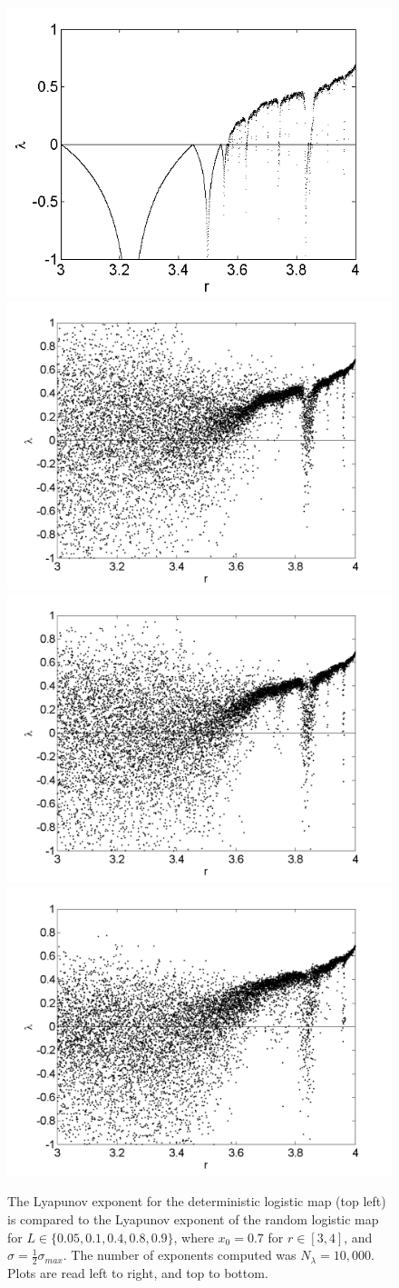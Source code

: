 \begin{figure}[!h]
\caption[Lyapunov exponent in the random logistic map compared to the
deterministic map, $\sigma=\frac{1}{2}\sigma_{max}$]{The Lyapunov exponent for the deterministic
  logistic map (top left) is compared
  to the Lyapunov exponent of the random logistic map for $L \in
  \{0.05,0.1,0.4,0.8,0.9\}$, where $x_0=0.7$ for $r \in [3,4]$, and $\sigma=\frac{1}{2}\sigma_{max}$. The number of exponents computed was $N_\lambda=10,000$. Plots are read left to right, and top to bottom. }\label{fig:rloglyap2_hs}
\centering
\includegraphics[width=.5\textwidth]{figs/det_log_lyap.png}\hfill
\includegraphics[width=.5\textwidth]{figs/rlog_lyap_halfsig_L_005.png}\\
\includegraphics[width=.5\textwidth]{figs/rlog_lyap_halfsig_L_01.png}\hfill
\includegraphics[width=.5\textwidth]{figs/rlog_lyap_halfsig_L_04.png}\\

\end{figure}
